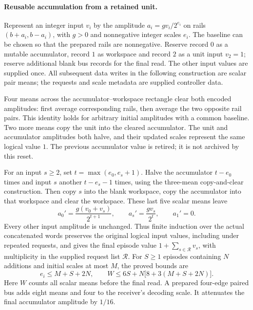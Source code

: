 \paragraph{Reusable accumulation from a retained unit.}
Represent an integer input $v_i$ by the amplitude
$a_i=g v_i/2^{e_i}$ on rails $(b+a_i,b-a_i)$, with $g>0$ and
nonnegative integer scales $e_i$. The baseline can be chosen so that the
prepared rails are nonnegative. Reserve record $0$ as a mutable accumulator,
record $1$ as workspace and record $2$ as a unit input $v_2=1$;
reserve additional blank bus records for the final read.
The other input values are supplied once. All subsequent data writes in the
following construction are scalar pair means; the requests and scale
metadata are supplied controller data.

Four means across the accumulator--workspace rectangle clear both encoded
amplitudes: first average corresponding rails, then average the two opposite
rail pairs. This identity holds for arbitrary initial amplitudes with a
common baseline. Two more means copy the unit into the cleared accumulator.
The unit and accumulator amplitudes both halve, and their updated scales
represent the same logical value $1$. The previous accumulator value is
retired; it is not archived by this reset.

For an input $s\geq2$, set $t=\max(e_0,e_s+1)$. Halve the accumulator
$t-e_0$ times and input $s$ another $t-e_s-1$ times, using the three-mean
copy-and-clear construction. Then copy $s$ into the blank workspace,
copy the accumulator into that workspace and clear the workspace. These
last five scalar means leave
\[
 a_0'=\frac{g(v_0+v_s)}{2^{t+1}},\qquad
 a_s'=\frac{g v_s}{2^t},\qquad a_1'=0.
\]
Every other input amplitude is unchanged. Thus finite induction over the
actual concatenated words preserves the original logical input values,
including under repeated requests, and gives the final episode value
$1+\sum_{s\in\mathcal R}v_s$, with multiplicity in the supplied request
list $\mathcal R$. For $S\geq1$ episodes containing $N$ additions and
initial scales at most $M$, the proved bounds are
\[
 e_i\leq M+S+2N,\qquad
 W\leq6S+N\bigl[8+3(M+S+2N)\bigr].
\]
Here $W$ counts all scalar means before the final read. A prepared
four-edge paired bus adds eight means and four to the receiver's decoding
scale. It attenuates the final accumulator amplitude by $1/16$.

